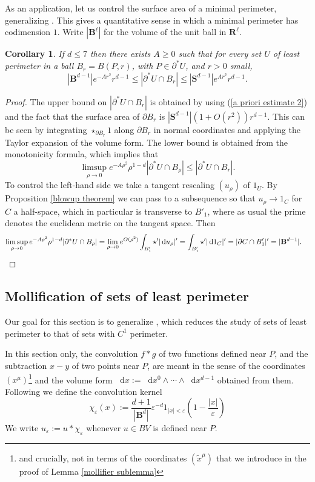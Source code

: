\documentclass[reqno,10pt]{amsart}
\newcommand{\RR}{\mathbf{R}}
\newcommand{\Sph}{\mathbf S}
\newcommand{\Ball}{\mathbf{B}}
\newcommand*\dif{\mathop{}\!\mathrm{d}}
\newtheorem{corollary}[theorem]{Corollary}
\theoremstyle{definition}
\numberwithin{equation}{section}
\begin{document}
As an application, let us control the surface area of a minimal perimeter, generalizing \cite[Remark 5.13]{Giusti77}.
This gives a quantitative sense in which a minimal perimeter has codimension $1$.
Write $|\Ball^\ell|$ for the volume of the unit ball in $\RR^\ell$.

\begin{corollary}\label{doubling dimension}
If $d \leq 7$ then there exists $A \geq 0$ such that for every set $U$ of least perimeter in a ball $B_r = B(P, r)$, with $P \in \partial^* U$, and $r > 0$ small,
$$|\Ball^{d - 1}|e^{-Ar^2}r^{d - 1} \leq |\partial^*U \cap B_r| \leq |\Sph^{d - 1}|e^{Ar^2} r^{d - 1}.$$
\end{corollary}
\begin{proof}
The upper bound on $|\partial^* U \cap B_r|$ is obtained by using (\ref{a priori estimate 2}) and the fact that the surface area of $\partial B_r$ is $|\Sph^{d - 1}|(1 + O(r^2))r^{d - 1}$.
This can be seen by integrating $\star_{\partial B_r} 1$ along $\partial B_r$ in normal coordinates and applying the Taylor expansion of the volume form.
The lower bound is obtained from the monotonicity formula, which implies that
$$\limsup_{\rho \to 0} e^{-A\rho^2} \rho^{1 - d} |\partial^* U \cap B_\rho| \leq |\partial^* U \cap B_r|.$$
To control the left-hand side we take a tangent rescaling $(u_\rho)$ of $1_U$.
By Proposition \ref{blowup theorem} we can pass to a subsequence so that $u_\rho \to 1_C$ for $C$ a half-space, which in particular is transverse to $B'_1$, where as usual the prime denotes the euclidean metric on the tangent space.
Then
\begin{align*}
\limsup_{\rho \to 0} e^{-A\rho^2} \rho^{1 - d} |\partial^* U \cap B_\rho| &= \lim_{\rho \to 0} e^{O(\rho^2)} \int_{B'_1} \star'|\dif u_\rho|' = \int_{B'_1} \star'|\dif 1_C|' = |\partial C \cap B'_1|' = |\Ball^{d - 1}|. \qedhere
\end{align*}
\end{proof}

\subsection{Mollification of sets of least perimeter}
Our goal for this section is to generalize \cite[Lemma 7.5]{Giusti77}, which reduces the study of sets of least perimeter to that of sets with $C^1$ perimeter.

In this section only, the convolution $f * g$ of two functions defined near $P$, and the subtraction $x - y$ of two points near $P$, are meant in the sense of the coordinates $(x^\mu)$\footnote{and crucially, not in terms of the coordinates $(\tilde x^\mu)$ that we introduce in the proof of Lemma \ref{mollifier sublemma}} and the volume form $\dif x := \dif x^0 \wedge \cdots \wedge \dif x^{d - 1}$ obtained from them. Following \cite[Chapter 7]{Giusti77} we define the convolution kernel
$$\chi_\varepsilon(x) := \frac{d + 1}{|\Ball^d|} \varepsilon^{-d}1_{|x| < \varepsilon} \left(1 - \frac{|x|}{\varepsilon}\right)$$
We write $u_\varepsilon := u * \chi_\varepsilon$ whenever $u \in BV$ is defined near $P$.
\end{document}
